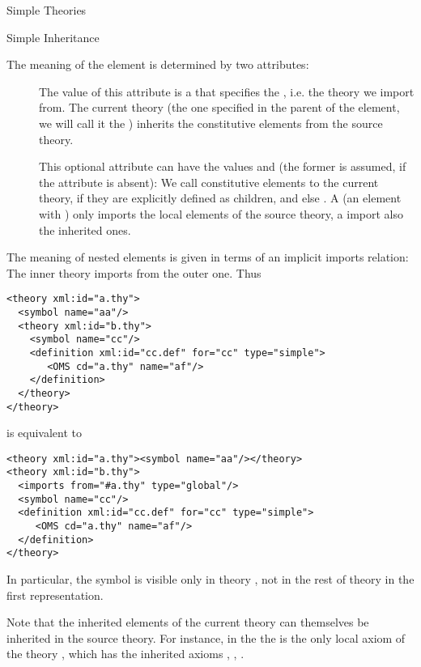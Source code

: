 \begin{module}[id=theories]
\begin{omgroup}{Simple Theories}
\begin{omgroup}[id=inheritance]{Simple Inheritance}
\begin{definition}[id=imports.def]
  The meaning of the {} element is determined by two attributes:
\begin{description}
\item[] The value of this attribute is a
  {} that specifies the ,
    i.e. the theory we import from.  The current theory (the one specified in
    the parent of the  element, we will call it the
    ) inherits the constitutive elements from the source
  theory.
\item[] This optional attribute can have the values
   and  (the former is
  assumed, if the attribute is absent): We call constitutive elements  to
  the current theory, if they are explicitly defined as children, and else
  .  A  (an  element with
  {}) only imports the local elements of the source theory, a
  {} import also the inherited ones.
\end{description}
\end{definition}

The meaning of nested  elements is given in terms of an implicit imports
relation: The inner theory imports from the outer one. Thus
\begin{lstlisting}[label=lst:nested-thy,index={theory}]
<theory xml:id="a.thy">
  <symbol name="aa"/>
  <theory xml:id="b.thy">
    <symbol name="cc"/>
    <definition xml:id="cc.def" for="cc" type="simple">
       <OMS cd="a.thy" name="af"/>
    </definition>
  </theory>
</theory>
\end{lstlisting}
is equivalent to 
\begin{lstlisting}[label=lst:nested-thy-equiv,index={theory}]
<theory xml:id="a.thy"><symbol name="aa"/></theory>
<theory xml:id="b.thy">
  <imports from="#a.thy" type="global"/>
  <symbol name="cc"/>
  <definition xml:id="cc.def" for="cc" type="simple">
     <OMS cd="a.thy" name="af"/>
  </definition>
</theory>
\end{lstlisting}
In particular, the symbol {} is visible only in theory {}, not
in the rest of theory {} in the first representation.

Note that the inherited elements of the current theory can themselves be inherited in the
source theory. For instance, in the {} the {} is the
only local axiom of the theory {}, which has the inherited axioms
{}, {}, {}.


\end{omgroup}
\end{omgroup}
\end{module}
